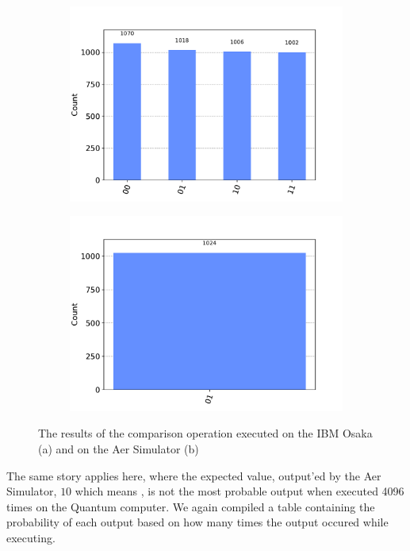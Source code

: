 \begin{figure}[!ht]
    \centering
    \begin{subfigure}{0.5\textwidth}
        \centering
        \includegraphics[scale=0.4]{images/6_Complete_System/nko_cmp_ibmq_result.pdf}
        \caption{}    
    \end{subfigure}
    \begin{subfigure}{0.5\textwidth}
        \centering
        \includegraphics[scale=0.4]{images/6_Complete_System/nko_cmp_aer_result.pdf}
        \caption{}
    \end{subfigure}
    \caption{The results of the comparison operation executed on the IBM Osaka (a) and on the Aer Simulator (b)}
\end{figure}

The same story applies here, where the expected value, output'ed by the Aer Simulator, $10$ which means , is not the most probable output when executed
4096 times on the Quantum computer. We again compiled a table containing the probability of each output based on how many times the output occured while executing.

